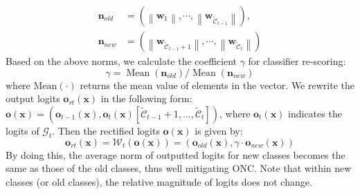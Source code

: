 \documentclass[letterpaper]{article} %
\begin{document}
\begin{equation}
\begin{aligned}
 \boldsymbol{n}_{old}&=\left(\left\|\mathbf{w}_{1}\right\|, \cdots,\left\|\mathbf{w}_{\tilde{\mathcal{C}}_{t-1}}\right\|\right),\\
\boldsymbol{n}_{new}&=\left(\left\|\mathbf{w}_{\tilde{\mathcal{C}}_{t-1}+1}\right\|, \cdots,\left\|\mathbf{w}_{\tilde{\mathcal{C}}_{t}}\right\|\right) \label{e8}
\end{aligned}
\end{equation}
Based on the above norms, we calculate the coefficient $\gamma$ for classifier re-scoring:
\begin{equation}
\gamma={\operatorname{Mean}\left(\boldsymbol{n}_{{old }}\right)}/{\operatorname{Mean}\left(\boldsymbol{n}_{{new }}\right)}
\label{e9}
\end{equation}
where $\operatorname{Mean(\cdot)}$ returns the mean value of elements in the vector. We rewrite the output logits $\boldsymbol{o}_{rt}(\boldsymbol{x})$ in the following form: $\boldsymbol{o}(\boldsymbol{x})=(\boldsymbol{o}_{t-1}(\boldsymbol{x}), \boldsymbol{o}_{t}(\boldsymbol{x})[\tilde{\mathcal{C}}_{t-1}+1,\dots,\tilde{\mathcal{C}}_{t}])$, where $\boldsymbol{o}_{t}(\boldsymbol{x})$ indicates the logits of $\mathcal{G}_{t}$. Then the rectified logits $\boldsymbol{o}(\boldsymbol{x})$ is given by:
\begin{equation}
\boldsymbol{o}_{rt}(\boldsymbol{x})=\mathcal{W}_{t}(\boldsymbol{o}(\boldsymbol{x})) = \left(\mathbf{o}_{o l d}(\boldsymbol{x}), \gamma \cdot \boldsymbol{o}_{n e w}(\boldsymbol{x})\right)
\label{e11}
\end{equation}
By doing this, the average norm of outputted logits for new classes becomes the same as those of the old classes, thus well mitigating ONC. Note that within new classes (or old classes), the relative magnitude of logits does not change. 
\end{document}
